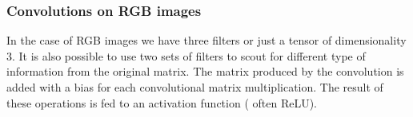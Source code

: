 \documentclass{article}
\begin{document}
\subsubsection{Convolutions on RGB images}
In the case of RGB images we have three filters or just a tensor of dimensionality 3. It is also possible to use two sets of filters to scout for different type of information from the original matrix. The matrix produced by the convolution is added with a bias for each convolutional matrix multiplication. The result of these operations is fed to an activation function ( often ReLU).
\end{document}
